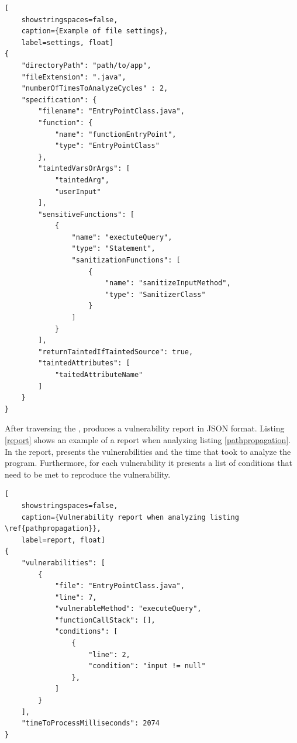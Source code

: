 \begin{lstlisting}[
    showstringspaces=false,
    caption={Example of file settings},
    label=settings, float]
{
    "directoryPath": "path/to/app",
    "fileExtension": ".java",
    "numberOfTimesToAnalyzeCycles" : 2,
    "specification": {
        "filename": "EntryPointClass.java",
        "function": {
            "name": "functionEntryPoint",
            "type": "EntryPointClass"
        },
        "taintedVarsOrArgs": [
            "taintedArg",
            "userInput"
        ],
        "sensitiveFunctions": [
            {
                "name": "exectuteQuery",
                "type": "Statement",
                "sanitizationFunctions": [
                    {
                        "name": "sanitizeInputMethod",
                        "type": "SanitizerClass"
                    }
                ]
            }
        ],
        "returnTaintedIfTaintedSource": true,
        "taintedAttributes": [
            "taitedAttributeName"
        ]
    }
}
\end{lstlisting}


After traversing the \astname{}, \toolname{} produces a vulnerability report in JSON format. Listing \ref{report} shows an example of a report when analyzing listing \ref{pathpropagation}. In the report, \toolname{} presents the vulnerabilities and the time that took to analyze the program. Furthermore, for each vulnerability it presents a list of conditions that need to be met to reproduce the vulnerability. 

\begin{lstlisting}[
    showstringspaces=false,
    caption={Vulnerability report when analyzing listing \ref{pathpropagation}},
    label=report, float]
{
    "vulnerabilities": [
        {
            "file": "EntryPointClass.java",
            "line": 7,
            "vulnerableMethod": "executeQuery",
            "functionCallStack": [],
            "conditions": [
                {
                    "line": 2,
                    "condition": "input != null"
                },
            ]
        }
    ],
    "timeToProcessMilliseconds": 2074
}
\end{lstlisting}


